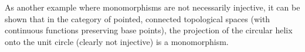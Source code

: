 \documentclass[12pt]{article}
\begin{document}
As another example where monomorphisms are not necessarily injective, it can be shown that in the category of pointed, connected topological spaces (with continuous functions preserving base points), the projection of the circular helix onto the unit circle (clearly not injective) is a monomorphism.
\end{document}
